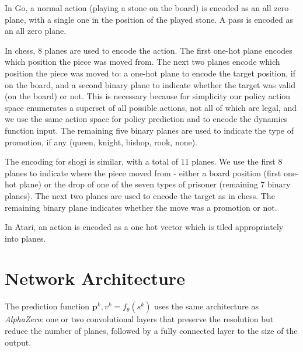 \documentclass{article}
\newcommand{\alphazero}{\emph{AlphaZero}}
\begin{document}
\begin{appendices}
In Go, a normal action (playing a stone on the board) is encoded as an all zero plane, with a single one in the position of the played stone. A pass is encoded as an all zero plane.

In chess, 8 planes are used to encode the action. The first one-hot plane encodes which position the piece was moved from. The next two planes encode which position the piece was moved to: a one-hot plane to encode the target position, if on the board, and a second binary plane to indicate whether the target was valid (on the board) or not. This is necessary because for simplicity our policy action space enumerates a superset of all possible actions, not all of which are legal, and we use the same action space for policy prediction and to encode the dynamics function input. The remaining five binary planes are used to indicate the type of promotion, if any (queen, knight, bishop, rook, none).

The encoding for shogi is similar, with a total of 11 planes. We use the first 8 planes to indicate where the piece moved from - either a board position (first one-hot plane) or the drop of one of the seven types of prisoner (remaining 7 binary planes). The next two planes are used to encode the target as in chess. The remaining binary plane indicates whether the move was a promotion or not.

In Atari, an action is encoded as a one hot vector which is tiled appropriately into planes.

\section{Network Architecture}

\label{sec:network_architecture}

The prediction function $\mathbf{p}^k, v^k = f_\theta(s^k)$ uses the same architecture as \alphazero{}: one or two convolutional layers that preserve the resolution but reduce the number of planes, followed by a fully connected layer to the size of the output.


\end{appendices}
\end{document}
